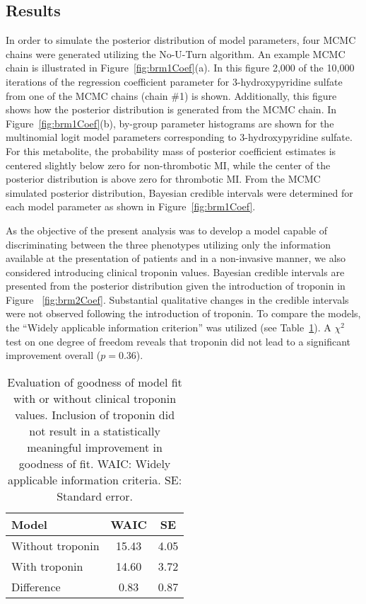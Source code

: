 \begin{DoubleSpace*}
\section{Results}
In order to simulate the posterior distribution of model parameters, four MCMC chains were generated utilizing the No-U-Turn algorithm. An example MCMC chain is illustrated in Figure~\ref{fig:brm1Coef}(a). In this figure 2,000 of the 10,000 iterations of the regression coefficient parameter for 3-hydroxypyridine sulfate from one of the MCMC chains (chain \#1) is shown. Additionally, this figure shows how the posterior distribution is generated from the MCMC chain. In Figure~\ref{fig:brm1Coef}(b), by-group parameter histograms are shown for the multinomial logit model parameters corresponding to  3-hydroxypyridine sulfate. For this metabolite, the probability mass of posterior coefficient estimates is centered slightly below zero for non-thrombotic MI, while the center of the posterior distribution is above zero for thrombotic MI. From the MCMC simulated posterior distribution, Bayesian credible intervals were determined for each model parameter as shown in Figure~\ref{fig:brm1Coef}. 

As the objective of the present analysis was to develop a model capable of discriminating between the three phenotypes utilizing only the information available at the presentation of patients and in a non-invasive manner, we also considered introducing clinical troponin values. Bayesian credible intervals are presented from the posterior distribution given the introduction of troponin in Figure ~\ref{fig:brm2Coef}. Substantial qualitative changes in the credible intervals were not observed following the introduction of troponin. To compare the models, the ``Widely applicable information criterion'' was utilized (see Table~\ref{tab:modelComp}). A $\chi^2$ test on one degree of freedom reveals that troponin did not lead to a significant improvement overall ($p=0.36$). 

\begin{table}[H]
	\centering
	 	\caption[Bayesian multinomial logistic regression model goodness of fit showing the model, the Widely Applicable Information Criteria (WAIC), and the Standard Error (SE)]{\DoubleSpacing Evaluation of goodness of model fit with or without clinical troponin values. Inclusion of troponin did not result in a statistically meaningful improvement in goodness of fit. WAIC: Widely applicable information criteria. SE: Standard error.}
	 	\label{tab:modelComp}
	\begin{tabular}{lcc}
		\hline
       Model & WAIC  & SE \\
       \hline
       Without troponin & 15.43 & 4.05 \\ 
       With troponin & 14.60 & 3.72 \\
       Difference & 0.83 & 0.87 \\
       \hline
	\end{tabular}
\end{table}

\end{DoubleSpace*}

